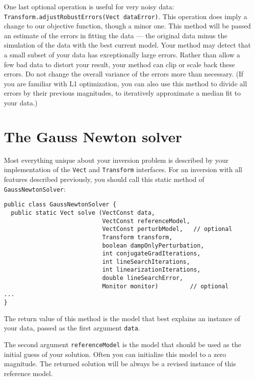 \documentclass[12pt]{article}
\begin{document}
One last optional operation is useful for
very noisy data:
\texttt{Transform\urlbr{}.adjust\-Robust\-Errors(Vect
data\-Error)}.  This operation does imply a
change to our objective function, though a
minor one.  This method will be passed an
estimate of the errors in fitting the data
--- the original data minus the simulation of
the data with the best current model.  Your
method may detect that a small subset of your
data has exceptionally large errors.  Rather
than allow a few bad data to distort your
result, your method can clip or scale back
these errors.  Do not change the overall
variance of the errors more than necessary.
(If you are familiar with L1 optimization,
you can also use this method to divide all
errors by their previous magnitudes, to
iteratively approximate a median fit to your
data.)

\section {The Gauss Newton solver}

Most everything unique about your inversion
problem is described by your implementation
of the \texttt{Vect} and \texttt{Transform}
interfaces.  For an inversion with all
features described previously, you should
call this static method of
\texttt{Gauss\-Newton\-Solver}:

{\footnotesize \begin{verbatim} 
public class GaussNewtonSolver {
  public static Vect solve (VectConst data,
                            VectConst referenceModel,
                            VectConst perturbModel,   // optional
                            Transform transform,     
                            boolean dampOnlyPerturbation,
                            int conjugateGradIterations,
                            int lineSearchIterations,
                            int linearizationIterations,
                            double lineSearchError,
                            Monitor monitor)         // optional
...
}
\end{verbatim}} 

The return value of this method is the model
that best explains an instance of your data,
passed as the first argument \texttt{data}.

The second argument \texttt{referenceModel}
is the model that should be used as the
initial guess of your solution.  Often you
can initialize this model to a zero
magnitude.  The returned solution will be
always be a revised instance of this
reference model.
\end{document}
